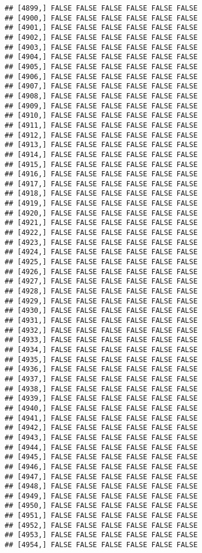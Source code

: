 \documentclass[
]{article}
\begin{document}
\begin{verbatim}
## [4899,] FALSE FALSE FALSE FALSE FALSE FALSE
## [4900,] FALSE FALSE FALSE FALSE FALSE FALSE
## [4901,] FALSE FALSE FALSE FALSE FALSE FALSE
## [4902,] FALSE FALSE FALSE FALSE FALSE FALSE
## [4903,] FALSE FALSE FALSE FALSE FALSE FALSE
## [4904,] FALSE FALSE FALSE FALSE FALSE FALSE
## [4905,] FALSE FALSE FALSE FALSE FALSE FALSE
## [4906,] FALSE FALSE FALSE FALSE FALSE FALSE
## [4907,] FALSE FALSE FALSE FALSE FALSE FALSE
## [4908,] FALSE FALSE FALSE FALSE FALSE FALSE
## [4909,] FALSE FALSE FALSE FALSE FALSE FALSE
## [4910,] FALSE FALSE FALSE FALSE FALSE FALSE
## [4911,] FALSE FALSE FALSE FALSE FALSE FALSE
## [4912,] FALSE FALSE FALSE FALSE FALSE FALSE
## [4913,] FALSE FALSE FALSE FALSE FALSE FALSE
## [4914,] FALSE FALSE FALSE FALSE FALSE FALSE
## [4915,] FALSE FALSE FALSE FALSE FALSE FALSE
## [4916,] FALSE FALSE FALSE FALSE FALSE FALSE
## [4917,] FALSE FALSE FALSE FALSE FALSE FALSE
## [4918,] FALSE FALSE FALSE FALSE FALSE FALSE
## [4919,] FALSE FALSE FALSE FALSE FALSE FALSE
## [4920,] FALSE FALSE FALSE FALSE FALSE FALSE
## [4921,] FALSE FALSE FALSE FALSE FALSE FALSE
## [4922,] FALSE FALSE FALSE FALSE FALSE FALSE
## [4923,] FALSE FALSE FALSE FALSE FALSE FALSE
## [4924,] FALSE FALSE FALSE FALSE FALSE FALSE
## [4925,] FALSE FALSE FALSE FALSE FALSE FALSE
## [4926,] FALSE FALSE FALSE FALSE FALSE FALSE
## [4927,] FALSE FALSE FALSE FALSE FALSE FALSE
## [4928,] FALSE FALSE FALSE FALSE FALSE FALSE
## [4929,] FALSE FALSE FALSE FALSE FALSE FALSE
## [4930,] FALSE FALSE FALSE FALSE FALSE FALSE
## [4931,] FALSE FALSE FALSE FALSE FALSE FALSE
## [4932,] FALSE FALSE FALSE FALSE FALSE FALSE
## [4933,] FALSE FALSE FALSE FALSE FALSE FALSE
## [4934,] FALSE FALSE FALSE FALSE FALSE FALSE
## [4935,] FALSE FALSE FALSE FALSE FALSE FALSE
## [4936,] FALSE FALSE FALSE FALSE FALSE FALSE
## [4937,] FALSE FALSE FALSE FALSE FALSE FALSE
## [4938,] FALSE FALSE FALSE FALSE FALSE FALSE
## [4939,] FALSE FALSE FALSE FALSE FALSE FALSE
## [4940,] FALSE FALSE FALSE FALSE FALSE FALSE
## [4941,] FALSE FALSE FALSE FALSE FALSE FALSE
## [4942,] FALSE FALSE FALSE FALSE FALSE FALSE
## [4943,] FALSE FALSE FALSE FALSE FALSE FALSE
## [4944,] FALSE FALSE FALSE FALSE FALSE FALSE
## [4945,] FALSE FALSE FALSE FALSE FALSE FALSE
## [4946,] FALSE FALSE FALSE FALSE FALSE FALSE
## [4947,] FALSE FALSE FALSE FALSE FALSE FALSE
## [4948,] FALSE FALSE FALSE FALSE FALSE FALSE
## [4949,] FALSE FALSE FALSE FALSE FALSE FALSE
## [4950,] FALSE FALSE FALSE FALSE FALSE FALSE
## [4951,] FALSE FALSE FALSE FALSE FALSE FALSE
## [4952,] FALSE FALSE FALSE FALSE FALSE FALSE
## [4953,] FALSE FALSE FALSE FALSE FALSE FALSE
## [4954,] FALSE FALSE FALSE FALSE FALSE FALSE

\end{verbatim}
\end{document}

